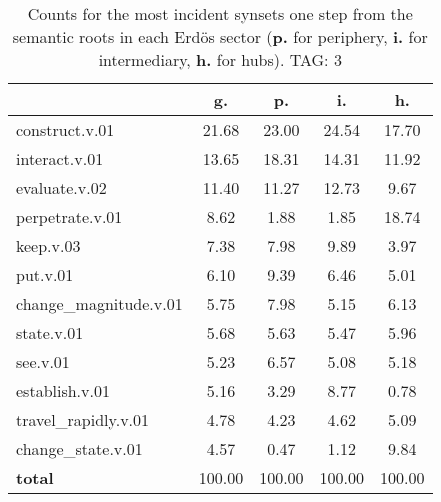 \begin{table}[h!]
\begin{center}
\begin{tabular}{| l | c | c | c | c |}\hline
 & g. & p. & i. & h. \\\hline
construct.v.01 & 21.68  & 23.00  & 24.54  & 17.70 \\\hline
interact.v.01 & 13.65  & 18.31  & 14.31  & 11.92 \\\hline
evaluate.v.02 & 11.40  & 11.27  & 12.73  & 9.67 \\\hline
perpetrate.v.01 & 8.62  & 1.88  & 1.85  & 18.74 \\\hline
keep.v.03 & 7.38  & 7.98  & 9.89  & 3.97 \\\hline
put.v.01 & 6.10  & 9.39  & 6.46  & 5.01 \\\hline
change\_magnitude.v.01 & 5.75  & 7.98  & 5.15  & 6.13 \\\hline
state.v.01 & 5.68  & 5.63  & 5.47  & 5.96 \\\hline
see.v.01 & 5.23  & 6.57  & 5.08  & 5.18 \\\hline
establish.v.01 & 5.16  & 3.29  & 8.77  & 0.78 \\\hline
travel\_rapidly.v.01 & 4.78  & 4.23  & 4.62  & 5.09 \\\hline
change\_state.v.01 & 4.57  & 0.47  & 1.12  & 9.84 \\\hline
{{\bf total}} & 100.00  & 100.00  & 100.00  & 100.00 \\\hline
\end{tabular}
\caption{Counts for the most incident synsets one step from the semantic roots in each Erd\"os sector ({\bf p.} for periphery, {\bf i.} for intermediary, {\bf h.} for hubs). TAG: 3}
\end{center}
\end{table}
